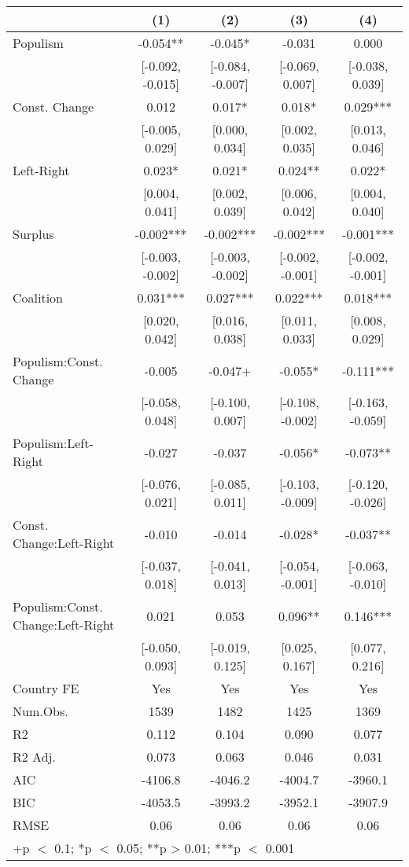 \begin{table}
\centering\centering\centering
\begin{tabular}[t]{lcccc}
\toprule
  & (1) & (2) & (3) & (4)\\
\midrule
Populism & -0.054** & -0.045* & -0.031 & 0.000\\
 & {}[-0.092, -0.015] & {}[-0.084, -0.007] & {}[-0.069, 0.007] & {}[-0.038, 0.039]\\
Const. Change & 0.012 & 0.017* & 0.018* & 0.029***\\
 & {}[-0.005, 0.029] & {}[0.000, 0.034] & {}[0.002, 0.035] & {}[0.013, 0.046]\\
Left-Right & 0.023* & 0.021* & 0.024** & 0.022*\\
 & {}[0.004, 0.041] & {}[0.002, 0.039] & {}[0.006, 0.042] & {}[0.004, 0.040]\\
Surplus & -0.002*** & -0.002*** & -0.002*** & -0.001***\\
 & {}[-0.003, -0.002] & {}[-0.003, -0.002] & {}[-0.002, -0.001] & {}[-0.002, -0.001]\\
Coalition & 0.031*** & 0.027*** & 0.022*** & 0.018***\\
 & {}[0.020, 0.042] & {}[0.016, 0.038] & {}[0.011, 0.033] & {}[0.008, 0.029]\\
Populism:Const. Change & -0.005 & -0.047+ & -0.055* & -0.111***\\
 & {}[-0.058, 0.048] & {}[-0.100, 0.007] & {}[-0.108, -0.002] & {}[-0.163, -0.059]\\
Populism:Left-Right & -0.027 & -0.037 & -0.056* & -0.073**\\
 & {}[-0.076, 0.021] & {}[-0.085, 0.011] & {}[-0.103, -0.009] & {}[-0.120, -0.026]\\
Const. Change:Left-Right & -0.010 & -0.014 & -0.028* & -0.037**\\
 & {}[-0.037, 0.018] & {}[-0.041, 0.013] & {}[-0.054, -0.001] & {}[-0.063, -0.010]\\
Populism:Const. Change:Left-Right & 0.021 & 0.053 & 0.096** & 0.146***\\
 & {}[-0.050, 0.093] & {}[-0.019, 0.125] & {}[0.025, 0.167] & {}[0.077, 0.216]\\
\midrule
Country FE & Yes & Yes & Yes & Yes\\
Num.Obs. & 1539 & 1482 & 1425 & 1369\\
R2 & 0.112 & 0.104 & 0.090 & 0.077\\
R2 Adj. & 0.073 & 0.063 & 0.046 & 0.031\\
AIC & -4106.8 & -4046.2 & -4004.7 & -3960.1\\
BIC & -4053.5 & -3993.2 & -3952.1 & -3907.9\\
RMSE & 0.06 & 0.06 & 0.06 & 0.06\\
\bottomrule
\multicolumn{5}{l}{\rule{0pt}{1em}+p $<$ 0.1; *p $<$ 0.05; **p > 0.01; ***p $<$ 0.001}\\
\end{tabular}
\end{table}
